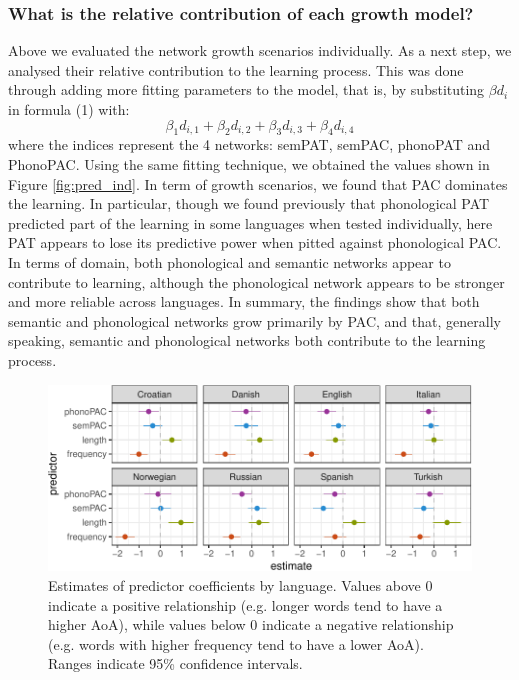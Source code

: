 \documentclass[10pt, letterpaper]{article}
\newenvironment{CodeChunk}{}{}
\begin{document}
\subsubsection{What is the relative contribution of each growth
model?}\label{what-is-the-relative-contribution-of-each-growth-model}

Above we evaluated the network growth scenarios individually. As a next
step, we analysed their relative contribution to the learning process.
This was done through adding more fitting parameters to the model, that
is, by substituting \(\beta d_i\) in formula (1) with:
\[\beta_{1} d_{i, 1} + \beta_{2} d_{i, 2} + \beta_{3} d_{i, 3} + \beta_{4} d_{i, 4}\]
where the indices represent the 4 networks: semPAT, semPAC, phonoPAT and
PhonoPAC. Using the same fitting technique, we obtained the values shown
in Figure \ref{fig:pred_ind}. In term of growth scenarios, we found that
PAC dominates the learning. In particular, though we found previously
that phonological PAT predicted part of the learning in some languages
when tested individually, here PAT appears to lose its predictive power
when pitted against phonological PAC. In terms of domain, both
phonological and semantic networks appear to contribute to learning,
although the phonological network appears to be stronger and more
reliable across languages. In summary, the findings show that both
semantic and phonological networks grow primarily by PAC, and that,
generally speaking, semantic and phonological networks both contribute
to the learning process.

\begin{CodeChunk}
\begin{figure}[h]

{\centering \includegraphics{figs/regressions_img-1} 

}

\caption{\label{fig:regressions_img}Estimates of predictor coefficients by language. Values above 0 indicate a positive relationship (e.g. longer words tend to have a higher AoA), while values below 0 indicate a negative relationship (e.g. words with higher frequency tend to have a lower AoA). Ranges indicate 95\% confidence intervals.}\label{fig:regressions_img}
\end{figure}
\end{CodeChunk}
\end{document}
